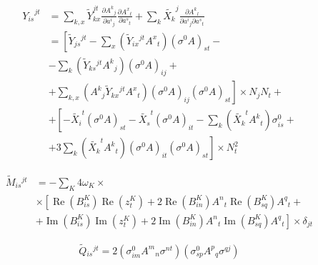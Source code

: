 \documentclass[aps,prl,reprint,amsmath,amssymb]{revtex4-1}
\begin{document}
%
\begin{equation} \label{eq:hessian-convert}
\begin{split}
{Y_{is}}^{jt} &= \sum_{k,x} \tilde{Y}_{kx}^{jt} \frac{\partial {A^k}_j}{\partial {a^i}_j} \frac{\partial {A^x}_t}{\partial {a^s}_t} + \sum_{k} \tilde{X_k}^j \frac{\partial {A^k}_l}{\partial {a^i}_j \partial{a^s}_t}  \\
&= \left[ \tilde{Y}{_{js}}^{jt} - \sum_{x}\left(\tilde{Y}{_{ix}}^{jt} {A^x}_t \right)\left(\sigma^0 A\right)_{st} - \right.\\
&\left. - \sum_{k}\left(\tilde{Y}{_{ks}}^{jt} {A^k}_j\right)\left(\sigma^0 A\right)_{ij} + \right.\\
&\left. + \sum_{k,x}\left({A^k}_j \tilde{Y}{_{kx}}^{jt} {A^x}_t\right)\left(\sigma^0 A\right)_{ij}\left(\sigma^0 A\right)_{st} \right] \times N_j N_t + \\
&+ \left[ -\tilde{X_i}^t \left(\sigma^0 A \right)_{st} - \tilde{X_s}^t \left(\sigma^0 A \right)_{it} - \sum_{k} \left( \tilde{X_k}^t {A^k}_t \right)\sigma^0_{is}  + \right.\\
&\left. + 3 \sum_{k} \left(\tilde{X_k}^t {A^k}_t \right) \left(\sigma^0 A\right)_{it} \left(\sigma^0 A\right)_{st} \right] \times N_{t}^2
\end{split}
\end{equation}
%


%
\begin{equation} \label{eq:hessian-loc}
\begin{split}
\tilde{M}{_{is}}^{jt} &= - \sum_K {4 \omega_K} \times \\ 
&\times \left[  \operatorname{Re}(B^{K}_{is}) \operatorname{Re}(z_{t}^{K}) + 2 \operatorname{Re}(B^{K}_{in}){A^{n}}_{t} \operatorname{Re}(B^{K}_{sq}){A^{q}}_{t} +  \right. \\
&\left. + \operatorname{Im}(B^{K}_{is}) \operatorname{Im}(z_{t}^{K}) + 2 \operatorname{Im}(B^{K}_{in}){A^{n}}_{t} \operatorname{Im}(B^{K}_{sq}){A^{q}}_{t}  \right] \times \delta_{jt}
\end{split}
\end{equation}
%

%
\begin{equation} \label{eq:hessian-pen}
\begin{split}
\tilde{Q}{_{is}}^{jt} = 2\left(\sigma_{im}^0 {A^m}_n \sigma^{nt}\right)\left(\sigma_{sp}^0 {A^p}_q \sigma^{qj}\right)
\end{split}
\end{equation}
%
\end{document}
